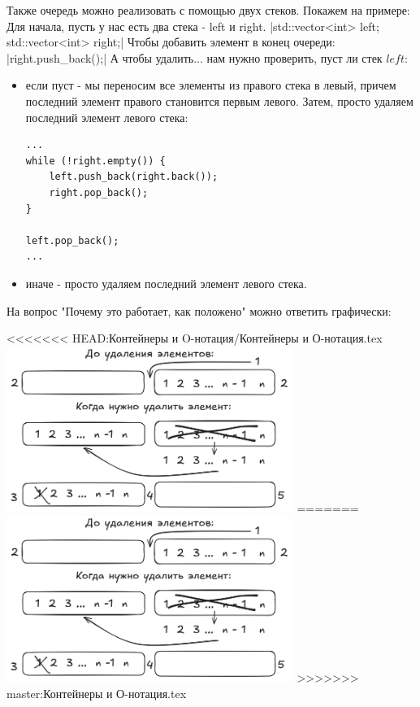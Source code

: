 \documentclass[a4paper,12pt]{article}
\begin{document}
\begin{itemize}
	      Также очередь можно реализовать с помощью двух стеков. Покажем на примере:
	      Для начала, пусть у нас есть два стека - left и right.
	      |std::vector<int> left; std::vector<int> right;|
	      Чтобы добавить элемент в конец очереди:
	      |right.push_back();|
	      А чтобы удалить... нам нужно проверить, пуст ли стек $left$:
	      \begin{itemize}
		      \item если пуст - мы переносим все элементы из правого стека в левый, причем последний
		            элемент правого становится первым левого. Затем, просто удаляем последний элемент
		            левого стека:
		            \begin{verbatim}
...
while (!right.empty()) {
    left.push_back(right.back());
    right.pop_back();
}

left.pop_back();
...
\end{verbatim}
		      \item иначе - просто удаляем последний элемент левого стека.
	      \end{itemize}

	      На вопрос "Почему это работает, как положено" можно ответить графически:

	      \begin{center}
<<<<<<< HEAD:Контейнеры и O-нотация/Контейнеры и О-нотация.tex
		      \includegraphics[width=0.7\textwidth]{../assets/queue with 2 stacks.png}
=======
		      \includegraphics[width=0.7\textwidth]{assets/queue with 2 stacks.png}
>>>>>>> master:Контейнеры и О-нотация.tex
	      \end{center}


\end{itemize}
\end{document}

